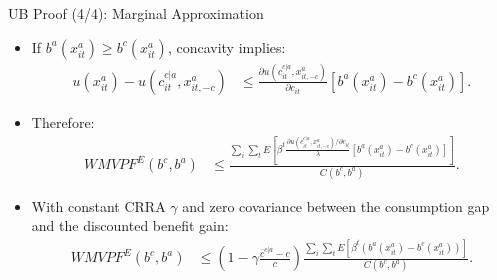 \begin{frame}[label=ubProofMU]{UB Proof (4/4): Marginal Approximation}
    \footnotesize
    \begin{itemize}
        \item If \(b^a(x^a_{it})\geq b^c(x^a_{it})\), concavity implies:
        \begin{align*}
            u(x^a_{it})-u(c^{c|a}_{it},x^a_{it,-c})
            &\le
            \frac{\partial u(c^{c|a}_{it},x^a_{it,-c})}{\partial c_{it}}
            \left[b^a(x^a_{it})-b^c(x^a_{it})\right].
        \end{align*}
        \item Therefore:
        \begin{align*}
            WMVPF^E(b^c,b^a)
            &\le
            \frac{\sum_i\sum_t E\left[
            \beta^t
            \frac{\partial u(c^{c|a}_{it},x^a_{it,-c})/\partial c_{it}}{\lambda}
            \left[b^a(x^a_{it})-b^c(x^a_{it})\right]
            \right]}{C(b^c,b^a)}.
        \end{align*}
        \item With constant CRRA \(\gamma\) and zero covariance between the consumption gap and the discounted benefit gain:
        \begin{align*}
            WMVPF^E(b^c,b^a)
            &\le
            \left(1-\gamma\frac{\bar c^{c|a}-c}{c}\right)
            \frac{\sum_i\sum_t E\left[\beta^t\left(b^a(x^a_{it})-b^c(x^a_{it})\right)\right]}
            {C(b^c,b^a)}.
        \end{align*}
    \end{itemize}
\end{frame}

